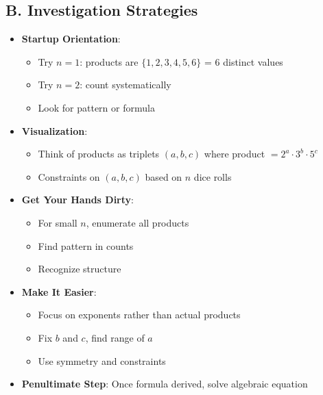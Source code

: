 \documentclass[12pt]{article}
\begin{document}
\begin{strategicbox}
\subsection*{B. Investigation Strategies}
\begin{itemize}[leftmargin=*]
    \item \textbf{Startup Orientation}: 
    \begin{itemize}
        \item Try $n = 1$: products are $\{1, 2, 3, 4, 5, 6\}$ = 6 distinct values
        \item Try $n = 2$: count systematically
        \item Look for pattern or formula
    \end{itemize}
    \item \textbf{Visualization}: 
    \begin{itemize}
        \item Think of products as triplets $(a, b, c)$ where product $= 2^a \cdot 3^b \cdot 5^c$
        \item Constraints on $(a, b, c)$ based on $n$ dice rolls
    \end{itemize}
    \item \textbf{Get Your Hands Dirty}: 
    \begin{itemize}
        \item For small $n$, enumerate all products
        \item Find pattern in counts
        \item Recognize structure
    \end{itemize}
    \item \textbf{Make It Easier}: 
    \begin{itemize}
        \item Focus on exponents rather than actual products
        \item Fix $b$ and $c$, find range of $a$
        \item Use symmetry and constraints
    \end{itemize}
    \item \textbf{Penultimate Step}: Once formula derived, solve algebraic equation
\end{itemize}


\end{strategicbox}
\end{document}
